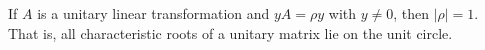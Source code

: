 If $A$ is a unitary linear transformation and $yA = \rho y$ with $y \neq 0$, then $|\rho| = 1$. That is, all characteristic roots of a unitary matrix lie on the unit circle.

